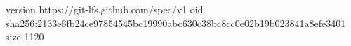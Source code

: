 version https://git-lfs.github.com/spec/v1
oid sha256:2133e6fb24ce97854545bc19990abc630c38bc8cc0e02b19b023841a8efe3401
size 1120
